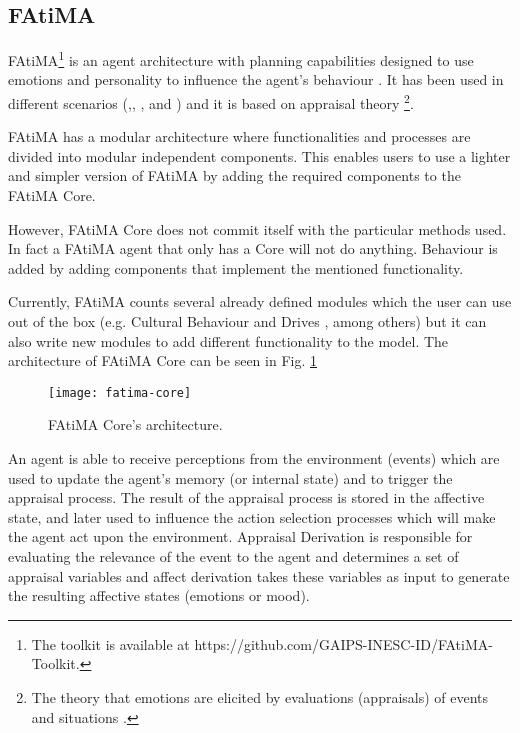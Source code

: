 \subsection{FAtiMA}
\label{sec:fatima}
\ac{FAtiMA}\footnote{The toolkit is available at https://github.com/GAIPS-INESC-ID/FAtiMA-Toolkit.} is an agent architecture with planning capabilities designed to use emotions and personality to influence the agent's behaviour \cite{dias:fatima-modular}.
It has been used in different scenarios (\cite{paiva:learning-by-feeling},\cite{rodrigues:i-can-feel-to}, \cite{aylett:intercultural-empathy}, and \cite{correia:sueca}) and it is based on appraisal theory \footnote{The theory that emotions are elicited by evaluations (appraisals) of events and situations \cite{roseman:appraisal}.}.

\ac{FAtiMA} has a modular architecture where functionalities and processes are divided into modular independent components.
This enables users to use a lighter and simpler version of \ac{FAtiMA} by adding the required components to the \ac{FAtiMA} Core.

However, \ac{FAtiMA} Core does not commit itself with the particular methods used.
In fact a FAtiMA agent that only has a Core will not do anything.
Behaviour is added by adding components that implement the mentioned functionality.

Currently, \ac{FAtiMA} counts several already defined modules which the user can use out of the box (e.g. Cultural Behaviour \cite{mascarenhas:cultural-behaviour} and Drives \cite{lim:affective-npcs}, among others) but it can also write new modules to add different functionality to the model.
The architecture of \ac{FAtiMA} Core can be seen in Fig. \ref{fig:fatima-core}

\begin{figure}
  \centering
    \texttt{[image: fatima-core]}
  \caption{\ac{FAtiMA} Core's architecture.}
  \label{fig:fatima-core}
\end{figure}

An agent is able to receive perceptions from the environment (events) which are used to update the agent's memory (or internal state) and to trigger the appraisal process.
The result of the appraisal process is stored in the affective state, and later used to influence the action selection processes which will make the agent act upon the environment.
Appraisal Derivation is responsible for evaluating the relevance of the event to the agent and determines a set of appraisal variables and affect derivation takes these variables as input to generate the resulting affective states (emotions or mood).


